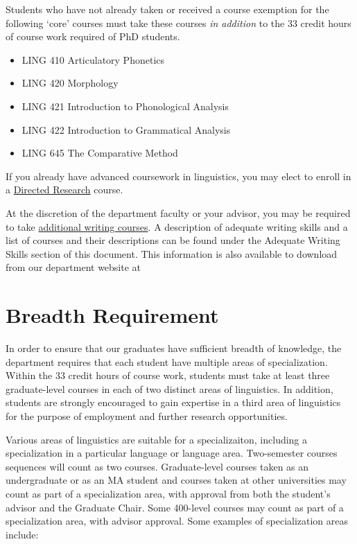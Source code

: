 \documentclass[
]{book}
\providecommand{\tightlist}{%
  \setlength{\itemsep}{0pt}\setlength{\parskip}{0pt}}
\begin{document}
Students who have not already taken or received a course exemption for the following `core' courses must take these courses \emph{in addition} to the 33 credit hours of course work required of PhD students.

\begin{itemize}
\tightlist
\item
  LING 410 Articulatory Phonetics
\item
  LING 420 Morphology
\item
  LING 421 Introduction to Phonological Analysis
\item
  LING 422 Introduction to Grammatical Analysis
\item
  LING 645 The Comparative Method
\end{itemize}

If you already have advanced coursework in linguistics, you may elect to enroll in a \hyperref[ling699]{Directed Research} course.

At the discretion of the department faculty or your advisor, you may be required to take \hyperref[writing]{additional writing courses}. A description of adequate writing skills and a list of courses and their descriptions can be found under the Adequate Writing Skills section of this document. This information is also available to download from our department website at

\section{Breadth Requirement}\label{breadth}

In order to ensure that our graduates have sufficient breadth of knowledge, the department requires that each student have multiple areas of specialization. Within the 33 credit hours of course work, students must take at least three graduate-level courses in each of two distinct areas of linguistics. In addition, students are strongly encouraged to gain expertise in a third area of linguistics for the purpose of employment and further research opportunities.

Various areas of linguistics are suitable for a specializaiton, including a specialization in a particular language or language area. Two-semester courses sequences will count as two courses. Graduate-level courses taken as an undergraduate or as an MA student and courses taken at other universities may count as part of a specialization area, with approval from both the student's advisor and the Graduate Chair. Some 400-level courses may count as part of a specialization area, with advisor approval. Some examples of specialization areas include:
\end{document}

